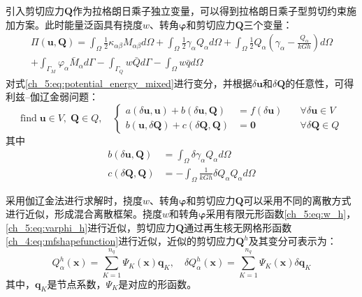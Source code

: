 引入剪切应力$\boldsymbol{Q}$作为拉格朗日乘子独立变量，可以得到拉格朗日乘子型剪切约束施加方案。此时能量泛函具有挠度$w$、转角$\boldsymbol{\varphi}$和剪切应力$\boldsymbol{Q}$三个变量：
\begin{multline}\label{ch_5:eq:potential_energy_mixed}
    \Pi(\boldsymbol{u},\boldsymbol Q) =\int_{\Omega}\frac{1}{2}\kappa_{\alpha\beta}M_{\alpha\beta}d\Omega +\int_{\Omega}\frac{1}{2}\gamma_{\alpha}Q_{\alpha}d\Omega
    + \int_\Omega \frac{1}{2} Q_\alpha (\gamma_\alpha - \frac{Q_\alpha}{kGh})d\Omega
    \\
    +\int_{\Gamma_{M}}\varphi_{\alpha}{\bar{M}_{\alpha}}d\Gamma-\int_{\Gamma_{Q}}{w}\bar {Q}d\Gamma-\int_{\Omega} w\bar{q}d\Omega
\end{multline}
对式\eqref{ch_5:eq:potential_energy_mixed}进行变分，并根据$\delta \boldsymbol u$和$\delta \boldsymbol Q$的任意性，可得利兹--伽辽金弱问题：
\begin{equation}\label{ch_5:eq:weak_mix}
    \text{find}\; \boldsymbol u \in V,\;\boldsymbol Q \in Q,\quad
    \left \{
    \begin{aligned}
        a(\delta \boldsymbol u, \boldsymbol u) + b(\delta \boldsymbol u,\boldsymbol Q) &= f(\delta \boldsymbol u) \quad &\forall \delta \boldsymbol u \in V \\
        b(\boldsymbol u, \delta \boldsymbol Q) +  c(\delta \boldsymbol Q,\boldsymbol Q)&= \boldsymbol 0 \quad &\forall \delta \boldsymbol Q \in Q
    \end{aligned}
    \right .
\end{equation}
其中
\begin{align}
    b(\delta \boldsymbol u, \boldsymbol Q) &= \int_{\Omega}\delta\gamma_{\alpha}Q_{\alpha}d\Omega \\
    c(\delta \boldsymbol Q, \boldsymbol Q) &= -\int_{\Omega}\frac{1}{kGh}\delta{Q}_{\alpha}{Q}_{\alpha}d\Omega
\end{align}

采用伽辽金法进行求解时，挠度$w$、转角$\boldsymbol{\varphi}$和剪切应力$\boldsymbol{Q}$可以采用不同的离散方式进行近似，形成混合离散框架。挠度$w$和转角$\boldsymbol{\varphi}$采用有限元形函数\eqref{ch_5:eq:w_h}，\eqref{ch_5:eq:varphi_h}进行近似，剪切应力$\boldsymbol{Q}$通过再生核无网格形函数\eqref{ch_4:eq:mfshapefunction}进行近似，近似的剪切应力$\boldsymbol{Q}^h$及其变分可表示为：
\begin{equation}\label{ch_5:eq:Q_h}
    Q^h_\alpha(\boldsymbol x) = \sum_{K=1}^{n_q} \Psi_K(\boldsymbol x) \boldsymbol{q}_{K},\quad \delta Q^h_\alpha(\boldsymbol x) = \sum_{K=1}^{n_q} \Psi_K(\boldsymbol x) \delta \boldsymbol{q}_{ K}
\end{equation}
其中，$\boldsymbol{q}_{ K}$是节点系数，$\Psi_K$是对应的形函数。

